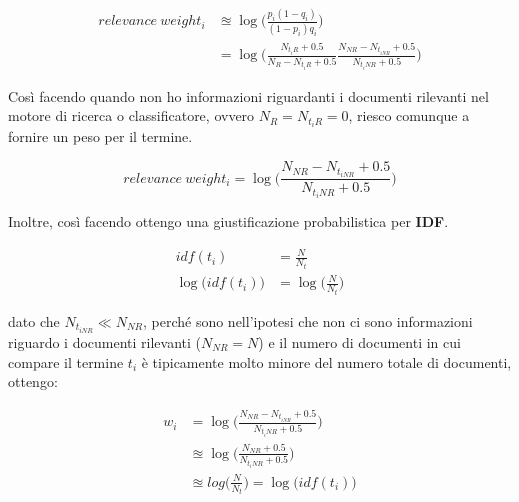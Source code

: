 \begin{align*}
	relevance \ weight_i  &\approxeq \log\bigg( \frac{p_i(1-q_i)}{(1-p_i)q_i} \bigg)	 \\
						  &= \log\bigg( \frac{N_{t_iR} + 0.5}{N_R - N_{t_iR} + 0.5} \frac{N_{NR} - N_{t_{iNR}}+ 0.5}{N_{t_iNR}+ 0.5} \bigg)		        
\end{align*}

\noindent Così facendo quando non ho informazioni riguardanti i documenti rilevanti nel motore di ricerca o classificatore, ovvero $N_R = N_{t_iR} = 0 $, riesco comunque a fornire un peso per il termine. 

$$
relevance \ weight_i = \log\bigg( \frac{N_{NR} - N_{t_{iNR}}+ 0.5}{N_{t_iNR}+ 0.5} \bigg)
$$

\noindent Inoltre, così facendo ottengo una giustificazione probabilistica per \textbf{IDF}.

\begin{align*}
idf(t_i)				&=  \frac{N}{N_t} \\
\log\big(idf(t_i) \big) &= \log\big( \frac{N}{N_t}\big) 
\end{align*}

dato che $N_{t_{iNR}} \ll N_{NR}$, perché sono nell'ipotesi che non ci sono informazioni riguardo i documenti rilevanti ($N_{NR} = N$) e il numero di documenti in cui compare il termine $t_i$ è tipicamente molto minore del numero totale di documenti, ottengo:

\begin{align*}
w_i &=\log\bigg( \frac{N_{NR} - N_{t_{iNR}}+ 0.5}{N_{t_iNR}+ 0.5} \bigg) \\
    &\approxeq \log\bigg( \frac{N_{NR} + 0.5}{N_{t_iNR}+ 0.5} \bigg) \\
    &\approxeq log\big( \frac{N}{N_t}\big) = \log\big(idf(t_i) \big)
\end{align*}















